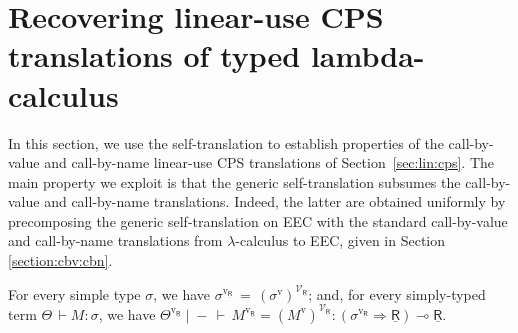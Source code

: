 \documentclass{LMCS}
\newcommand{\comptype}[1]{\underline{#1}}
\newcommand{\CR}{\comptype{\mathsf{R}}}
\newcommand{\lpop}{\multimap}
\newcommand{\Cfun}{\Rightarrow}
\newcommand{\rIn}[2]{#1 \colon  #2}
\newcommand{\Ceq}[5]{#1 \mid  \! #2 \, \vdash \, #3 = #4 \colon #5}
\newcommand{\Veq}[4]{\Ceq{#1}{-}{#2}{#3}{#4}}
\newcommand{\Lj}[3]{#1  \, \vdash  \rIn{#2}{#3}}
\newcommand{\cbv}[1]{#1^{\mathrm{v}}}
\newcommand{\cbvLincps}[1]{#1^{\mathrm{v_{\CR}}}}
\newcommand{\CpsVT}[1]{#1^{\mathcal{V}_{\CR}}}
\newcommand{\CpsVTcbv}[1]{\CpsVT{(\cbv{#1})}}
\begin{document}
\def\Groupoid{\mathbf{Grpd}}
\def\cni{{cni}}
\def\fudgey{sufficiently bicomplete}

\section{Recovering linear-use CPS translations of typed lambda-calculus}
\label{section:recovering}

In this section, we use the self-translation to establish properties
of the call-by-value and call-by-name linear-use CPS translations
of Section~\ref{sec:lin:cps}. The main property we exploit 
is that  the generic self-translation 
subsumes  the call-by-value
and call-by-name translations.
Indeed, the latter are obtained uniformly by precomposing the
generic self-translation on EEC with 
the standard call-by-value and call-by-name translations
from $\lambda$-calculus to EEC, given in Section \ref{section:cbv:cbn}.

\begin{thm}[Recovering $\cbvLincps{(\cdot)}$]
\label{theorem:recover:cbv}
For every simple type $\sigma$, we have 
$\cbvLincps{\sigma} \, = \, \CpsVTcbv{\sigma}$; and, for
every simply-typed term $\Lj{\Theta}{M}{\sigma}$, we have 
$\Veq{\cbvLincps{\Theta}}{\cbvLincps{M}}{\CpsVTcbv{M}}{(\cbvLincps{\sigma} \Cfun \CR) \lpop \CR}$.
\end{thm}
\end{document}

